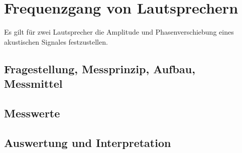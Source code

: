 %
%
\chapter{Frequenzgang von Lautsprechern}
Es gilt für zwei Lautsprecher die Amplitude und Phasenverschiebung eines akustischen Signales festzustellen.

\label{chap:FrequenzgangVonLautsprechern}

\section{Fragestellung, Messprinzip, Aufbau, Messmittel}

\label{chap:VERSUCH_2_FRAGESTELLUNG}

\section{Messwerte}
\label{chap:VERSUCH_2_MESSWERTE}


\section{Auswertung und Interpretation}
\label{chap:AUSWERTUNGUNDINTERPRETATION}



